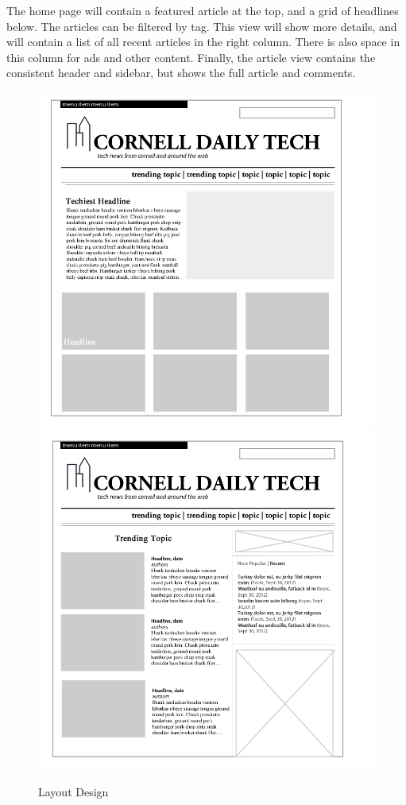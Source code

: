\documentclass[12pt]{article} %
\begin{document}
The home page will contain a featured article at the top, and a grid of headlines below. The articles can be filtered by tag. This view will show more details, and will contain a list of all recent articles in the right column. There is also space in this column for ads and other content. Finally, the article view contains the consistent header and sidebar, but shows the full article and comments.

\begin{figure}[htbp]
\begin{center}
\includegraphics[width=5in]{images/01_minimum}
\includegraphics[width=5in]{images/02_minimum}
\caption{Layout Design}
\end{center}
\end{figure}
\end{document}
